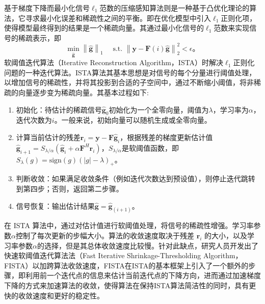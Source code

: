 \documentclass{xdupgthesis}
\begin{document}
基于梯度下降而最小化信号$\ell_1$范数的压缩感知算法则是一种基于凸优化理论的算法，它寻求最小化误差和稀疏性之间的平衡。即在优化模型中引入$\ell_1$正则化项，使得模型最终得到的结果是一个稀疏向量。其通过最小化信号的$\ell_1$范数来实现信号的稀疏表示，即
\begin{equation}
    \label{eq2-4}
        \underset{\hat{\mathbf g}}\min \left\| { \hat{\mathbf g}}\right\|_{1}
        \quad
        \text { s.t. }\left\|{\mathbf {y}}- \mathbf F(i) \hat{\mathbf g}\right\|_{2}^2<\epsilon。
\end{equation}
软阈值迭代算法（Iterative Reconstruction Algorithm，ISTA）时解决$\ell_1$正则化问题的一种迭代算法。ISTA算法其基本思想是对信号的每个分量进行阈值处理，以增加信号的稀疏性，并将其投影到合适的子空间中，通过不断缩小阈值，将非稀疏的向量逐步变为稀疏向量。其基本过程如下:
\begin{enumerate}
	\item 初始化：待估计的稀疏信号$\hat{\mathbf{g}}_0$初始化为一个全零向量，阈值为$\lambda$，学习率为$\alpha$，迭代次数为$i$。一般来说，初始向量可以随机生成或全零向量。
	\item 计算当前估计的残差$\mathbf{r}_i = \mathbf{y} - \mathbf{F} \hat{\mathbf{g}}_{i}$，根据残差的梯度更新估计值$\hat{\mathbf{g}}_{i+1} = S_{\lambda/\alpha}(\hat{\mathbf{g}}_{i} + \alpha \mathbf{F}^H \mathbf{r}_{i})$，$S_{\lambda/\alpha}$是软阈值函数，即$S_{\lambda}(g) = \text{sign}(g) (\lvert g \rvert - \lambda)_+$。
	\item 判断收敛：如果满足收敛条件（例如迭代次数达到预设值），则停止迭代跳转到第四步；否则，返回第二步骤。
	\item 信号恢复：输出估计结果$\hat{\mathbf{g}} = \hat{\mathbf{g}}_{(i+1)}$。
\end{enumerate}
在 ISTA 算法中，通过对估计值进行软阈值处理，将信号的稀疏性增强。学习率参数$\alpha$控制了每次更新的步幅大小。算法的收敛速度取决于残差 $\mathbf{r}_{i}$ 的大小，以及学习率参数$\alpha$的选择，但是其总体收敛速度比较慢。针对此缺点，研究人员开发出了快速软阈值迭代算法法（Fast Iterative Shrinkage-Thresholding Algorithm，FISTA）\parencite{fista}以加跨算法收敛速度，FISTA在ISTA的基本框架上引入了一个额外的步骤，即利用前一个迭代点的信息来估计当前迭代点的下降方向，进而通过加速梯度下降的方式来加速算法的收敛，使得算法在保持ISTA算法简洁性的同时，具有更快的收敛速度和更好的稳定性。
\end{document}
